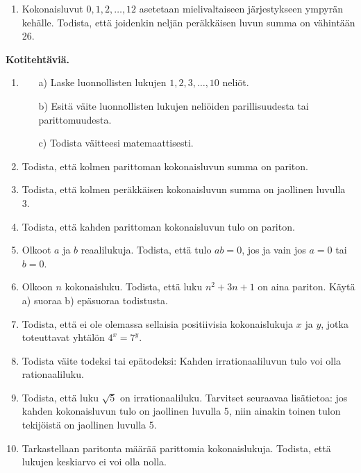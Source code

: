\begin{enumerate}
\item Kokonaisluvut $0, 1, 2, \ldots, 12$ asetetaan
mielivaltaiseen järjestykseen ympyrän kehälle. Todista,
että joidenkin neljän peräkkäisen luvun summa on
vähintään 26.

\end{enumerate}

{\bf Kotitehtäviä.}

\begin{enumerate}

\item
\begin{itemize}
\item[a)] Laske luonnollisten lukujen $1, 2, 3,\ldots,
10$ neliöt.
\item[b)] Esitä väite luonnollisten lukujen neliöiden
parillisuudesta tai parittomuudesta.
\item[c)] Todista väitteesi matemaattisesti.
\end{itemize}

\item Todista, että kolmen parittoman kokonaisluvun summa on pariton.

\item Todista, että kolmen peräkkäisen kokonaisluvun summa
on jaollinen luvulla 3.

\item Todista, että kahden parittoman kokonaisluvun tulo
on pariton.

\item Olkoot $a$ ja $b$ reaalilukuja. Todista, että tulo $ab = 0$, jos ja vain jos $a=0$ tai $b=0$.

\item Olkoon $n$ kokonaisluku. Todista, että luku $n^{2} + 3n + 1$ on aina pariton. Käytä a) suoraa b) epäsuoraa
todistusta.

\item Todista, että ei ole olemassa sellaisia
positiivisia kokonaislukuja $x$ ja $y$, jotka toteuttavat
yhtälön $4^{x} = 7^{y}$.

\item Todista väite todeksi tai epätodeksi: Kahden
irrationaaliluvun tulo voi olla rationaaliluku.

\item Todista, että luku $\sqrt{5}$ on irrationaaliluku.
Tarvitset seuraavaa lisätietoa: jos kahden kokonaisluvun
tulo on jaollinen luvulla 5, niin ainakin toinen tulon
tekijöistä on jaollinen luvulla 5.

\item Tarkastellaan paritonta määrää parittomia
kokonaislukuja. Todista, että lukujen keskiarvo ei voi
olla nolla.


\end{enumerate}

